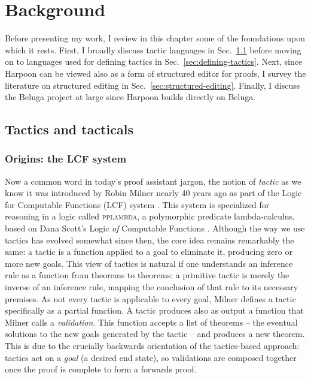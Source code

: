 \chapter{Background}
\label{chap:background}

Before presenting my work, I review in this chapter some of the foundations upon
which it rests.
First, I broadly discuss tactic languages in
Sec.~\ref{sec:tactics-tacticals} before moving on to languages used for
defining tactics in Sec.~\ref{sec:defining-tactics}.
Next, since Harpoon can be viewed also as a form of structured editor for
proofs, I survey the literature on structured editing in
Sec.~\ref{sec:structured-editing}.
Finally, I discuss the Beluga project at large since Harpoon builds directly on
Beluga.

\section{Tactics and tacticals}
\label{sec:tactics-tacticals}

\subsection{Origins: the LCF system}

Now a common word in today's proof assistant jargon, the notion of \emph{tactic}
as we know it was introduced by Robin Milner nearly 40 years ago
as part of the Logic for Computable Functions (LCF) system
\cite{milner-tactics, lcf}.
This system is specialized for reasoning in a logic called \textsc{pplambda}, a
polymorphic predicate lambda-calculus, based on Dana Scott's Logic \emph{of}
Computable Functions \cite{scott-lcf}.
Although the way we use tactics has evolved somewhat since then, the core idea
remains remarkably the same: a tactic is a function applied to a goal to
eliminate it, producing zero or more new goals.
This view of tactics is natural if one understands an inference rule as a
function from theorems to theorems: a primitive tactic is merely the inverse of
an inference rule, mapping the conclusion of that rule to its necessary
premises.
As not every tactic is applicable to every goal, Milner defines a tactic
specifically as a partial function.
A tactic produces also as output a function that Milner calls a
\emph{validation}.
This function accepts a list of theorems -- the eventual solutions to the new
goals generated by the tactic -- and produces a new theorem.
This is due to the crucially backwards orientation of the tactics-based
approach: tactics act on a \emph{goal} (a desired end state), so validations
are composed together once the proof is complete to form a forwards proof.

